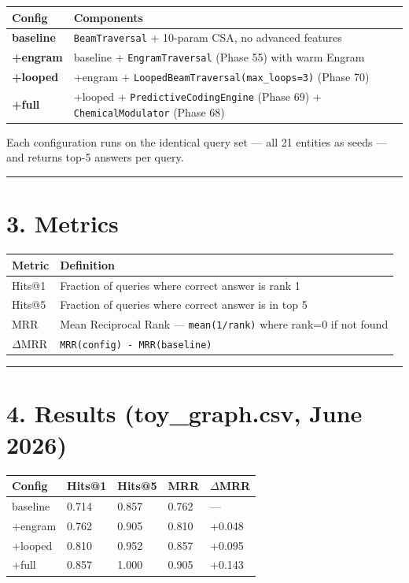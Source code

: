 \begin{table}[h]
\small\centering
\begin{tabular}{ll}
\toprule
Config & Components \\
\midrule
\textbf{baseline} & \texttt{BeamTraversal} + 10-param CSA, no advanced features \\
\textbf{+engram} & baseline + \texttt{EngramTraversal} (Phase 55) with warm Engram \\
\textbf{+looped} & +engram + \texttt{LoopedBeamTraversal(max\_loops=3)} (Phase 70) \\
\textbf{+full} & +looped + \texttt{PredictiveCodingEngine} (Phase 69) + \texttt{ChemicalModulator} (Phase 68) \\
\bottomrule
\end{tabular}
\end{table}


Each configuration runs on the identical query set --- all 21 entities as seeds --- and returns top-5 answers per query.

\medskip\noindent\rule{\linewidth}{0.4pt}\medskip

\section*{3. Metrics}

\begin{table}[h]
\small\centering
\begin{tabular}{ll}
\toprule
Metric & Definition \\
\midrule
Hits@1 & Fraction of queries where correct answer is rank 1 \\
Hits@5 & Fraction of queries where correct answer is in top 5 \\
MRR & Mean Reciprocal Rank --- \texttt{mean(1/rank)} where rank=0 if not found \\
$\Delta$MRR & \texttt{MRR(config) - MRR(baseline)} \\
\bottomrule
\end{tabular}
\end{table}


\medskip\noindent\rule{\linewidth}{0.4pt}\medskip

\section*{4. Results (toy_graph.csv, June 2026)}

\begin{table}[h]
\small\centering
\begin{tabular}{lllll}
\toprule
Config & Hits@1 & Hits@5 & MRR & $\Delta$MRR \\
\midrule
baseline & 0.714 & 0.857 & 0.762 & --- \\
+engram & 0.762 & 0.905 & 0.810 & +0.048 \\
+looped & 0.810 & 0.952 & 0.857 & +0.095 \\
+full & 0.857 & 1.000 & 0.905 & +0.143 \\
\bottomrule
\end{tabular}
\end{table}


